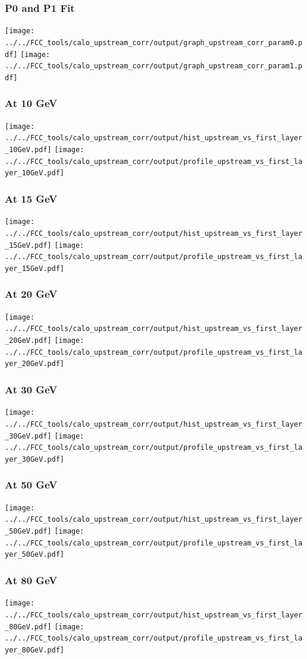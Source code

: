 \documentclass{beamer}
\begin{document}
\begin{frame}
  \frametitle{P0 and P1 Fit}

  \texttt{[image: ../../FCC\_tools/calo\_upstream\_corr/output/graph\_upstream\_corr\_param0.pdf]}
  \texttt{[image: ../../FCC\_tools/calo\_upstream\_corr/output/graph\_upstream\_corr\_param1.pdf]}
\end{frame}

\begin{frame}
  \frametitle{At 10 GeV}

  \texttt{[image: ../../FCC\_tools/calo\_upstream\_corr/output/hist\_upstream\_vs\_first\_layer\_10GeV.pdf]}
  \texttt{[image: ../../FCC\_tools/calo\_upstream\_corr/output/profile\_upstream\_vs\_first\_layer\_10GeV.pdf]}
\end{frame}


\begin{frame}
  \frametitle{At 15 GeV}

  \texttt{[image: ../../FCC\_tools/calo\_upstream\_corr/output/hist\_upstream\_vs\_first\_layer\_15GeV.pdf]}
  \texttt{[image: ../../FCC\_tools/calo\_upstream\_corr/output/profile\_upstream\_vs\_first\_layer\_15GeV.pdf]}
\end{frame}

\begin{frame}
  \frametitle{At 20 GeV}

  \texttt{[image: ../../FCC\_tools/calo\_upstream\_corr/output/hist\_upstream\_vs\_first\_layer\_20GeV.pdf]}
  \texttt{[image: ../../FCC\_tools/calo\_upstream\_corr/output/profile\_upstream\_vs\_first\_layer\_20GeV.pdf]}
\end{frame}

\begin{frame}
  \frametitle{At 30 GeV}

  \texttt{[image: ../../FCC\_tools/calo\_upstream\_corr/output/hist\_upstream\_vs\_first\_layer\_30GeV.pdf]}
  \texttt{[image: ../../FCC\_tools/calo\_upstream\_corr/output/profile\_upstream\_vs\_first\_layer\_30GeV.pdf]}
\end{frame}

\begin{frame}
  \frametitle{At 50 GeV}

  \texttt{[image: ../../FCC\_tools/calo\_upstream\_corr/output/hist\_upstream\_vs\_first\_layer\_50GeV.pdf]}
  \texttt{[image: ../../FCC\_tools/calo\_upstream\_corr/output/profile\_upstream\_vs\_first\_layer\_50GeV.pdf]}
\end{frame}

\begin{frame}
  \frametitle{At 80 GeV}

  \texttt{[image: ../../FCC\_tools/calo\_upstream\_corr/output/hist\_upstream\_vs\_first\_layer\_80GeV.pdf]}
  \texttt{[image: ../../FCC\_tools/calo\_upstream\_corr/output/profile\_upstream\_vs\_first\_layer\_80GeV.pdf]}
\end{frame}
\end{document}
